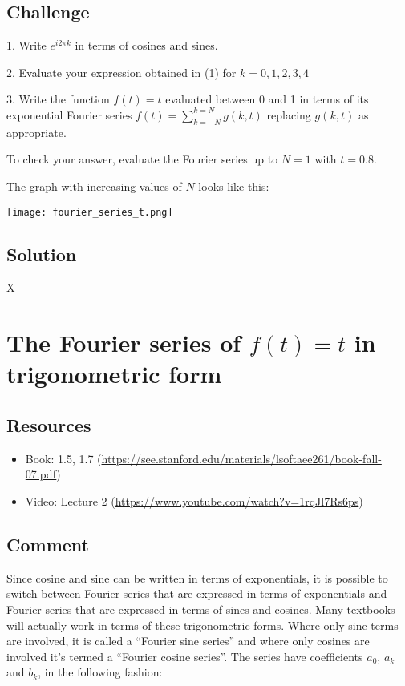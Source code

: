 \subsection*{Challenge}
1. Write $e^{i 2 \pi k}$ in terms of cosines and sines.

2. Evaluate your expression obtained in (1) for $k=0,1,2,3,4$

3. Write the function $f(t)=t$ evaluated between 0 and 1 in terms of its exponential Fourier series $f(t)=\sum_{k=-N}^{k=N} g(k,t)$ replacing $g(k,t)$ as appropriate.

To check your answer, evaluate the Fourier series up to $N=1$ with $t=0.8$.

The graph with increasing values of $N$ looks like this:

\texttt{[image: fourier\_series\_t.png]}

\subsection*{Solution}
X





\newpage

\section{The Fourier series of $f(t)=t$ in trigonometric form}
\label{sec:trigexpconvert}

\subsection*{Resources}
\begin{itemize}
    \item Book: 1.5, 1.7 (\url{https://see.stanford.edu/materials/lsoftaee261/book-fall-07.pdf})
    \item Video: Lecture 2 (\url{https://www.youtube.com/watch?v=1rqJl7Rs6ps})
\end{itemize}

\subsection*{Comment}
Since cosine and sine can be written in terms of exponentials, it is possible to switch between Fourier series that are expressed in terms of exponentials and Fourier series that are expressed in terms of sines and cosines. Many textbooks will actually work in terms of these trigonometric forms. Where only sine terms are involved, it is called a ``Fourier sine series'' and where only cosines are involved it's termed a ``Fourier cosine series''. The series have coefficients $a_0$, $a_k$ and $b_k$, in the following fashion:

